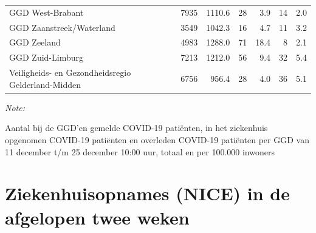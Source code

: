 \documentclass[
  english,
  man,floatsintext]{apa6}
\begin{document}
\begin{table}
\begin{threeparttable}
\begin{tabular}{lrrrrrr}
GGD West-Brabant & 7935 & 1110.6 & 28 & 3.9 & 14 & 2.0\\
GGD Zaanstreek/Waterland & 3549 & 1042.3 & 16 & 4.7 & 11 & 3.2\\
GGD Zeeland & 4983 & 1288.0 & 71 & 18.4 & 8 & 2.1\\
GGD Zuid-Limburg & 7213 & 1212.0 & 56 & 9.4 & 32 & 5.4\\
Veiligheids- en Gezondheidsregio Gelderland-Midden & 6756 & 956.4 & 28 & 4.0 & 36 & 5.1\\
\bottomrule
\end{tabular}
\begin{tablenotes}
\item \textit{Note: } 
\item Aantal bij de GGD’en gemelde COVID-19 patiënten, in het ziekenhuis opgenomen COVID-19 patiënten en overleden COVID-19 patiënten per GGD van 11 december t/m 25 december 10:00 uur, totaal en per 100.000 inwoners
\end{tablenotes}
\end{threeparttable}
\endgroup{}
\end{table}

\newpage

\hypertarget{ziekenhuisopnames-nice-in-de-afgelopen-twee-weken}{%
\section{Ziekenhuisopnames (NICE) in de afgelopen twee weken}\label{ziekenhuisopnames-nice-in-de-afgelopen-twee-weken}}
\end{document}

